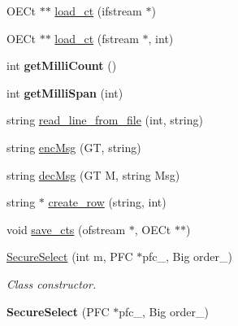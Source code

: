 \begin{DoxyCompactItemize}
\item 
O\+E\+Ct $\ast$$\ast$ \hyperlink{classSecureSelect_a2163cc84d91843d5ba52876cf75d9d83}{load\+\_\+ct} (ifstream $\ast$)
\item 
O\+E\+Ct $\ast$$\ast$ \hyperlink{classSecureSelect_affb3955cbfae50ba7bac4c487aef0113}{load\+\_\+ct} (fstream $\ast$, int)
\item 
int {\bfseries get\+Milli\+Count} ()\hypertarget{classSecureSelect_a772ad7704ae82ada1dfbbafdde5def20}{}\label{classSecureSelect_a772ad7704ae82ada1dfbbafdde5def20}

\item 
int {\bfseries get\+Milli\+Span} (int)\hypertarget{classSecureSelect_a8b3934a352f33f8ca62d6ebe13e1c530}{}\label{classSecureSelect_a8b3934a352f33f8ca62d6ebe13e1c530}

\item 
string \hyperlink{classSecureSelect_adf030b491e451b677f574098c9710327}{read\+\_\+line\+\_\+from\+\_\+file} (int, string)
\item 
string \hyperlink{classSecureSelect_a9debad6f3844b3310e359437daee5289}{enc\+Msg} (GT, string)
\item 
string \hyperlink{classSecureSelect_a58b6ca8e574976a632d8f862b939b877}{dec\+Msg} (GT M, string Msg)
\item 
string $\ast$ \hyperlink{classSecureSelect_ad7d812d5cb93f4a0cd93754532c22fcf}{create\+\_\+row} (string, int)
\item 
void \hyperlink{classSecureSelect_ac0281d1df5b3f12e05d992f684f24e01}{save\+\_\+cts} (ofstream $\ast$, O\+E\+Ct $\ast$$\ast$)
\item 
\hyperlink{classSecureSelect_a88cd629de7214c05eb86683b058bacd5}{Secure\+Select} (int m, P\+FC $\ast$pfc\+\_\+, Big order\+\_\+)
\begin{DoxyCompactList}\small\item\em Class constructor. \end{DoxyCompactList}\item 
{\bfseries Secure\+Select} (P\+FC $\ast$pfc\+\_\+, Big order\+\_\+)\hypertarget{classSecureSelect_a3270108d70fee40d40a28ebccee7ed2a}{}\label{classSecureSelect_a3270108d70fee40d40a28ebccee7ed2a}

\end{DoxyCompactItemize}
